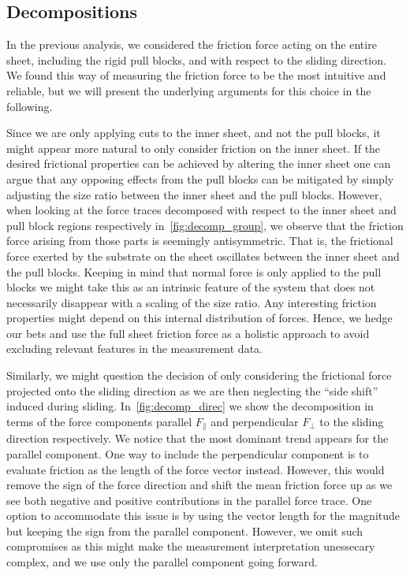 \subsection{Decompositions}
In the previous analysis, we considered the friction force acting on the entire
sheet, including the rigid pull blocks, and with respect to the sliding
direction. We found this way of measuring the friction force to be the most
intuitive and reliable, but we will present the underlying arguments for this
choice in the following.

Since we are only applying cuts to the inner sheet, and not the pull blocks, it
might appear more natural to only consider friction on the inner sheet. If the
desired frictional properties can be achieved by altering the inner sheet one
can argue that any opposing effects from the pull blocks can be mitigated by
simply adjusting the size ratio between the inner sheet and the pull blocks.
However, when looking at the force traces decomposed with respect to the inner
sheet and pull block regions respectively in~\cref{fig:decomp_group}, we observe
that the friction force arising from those parts is seemingly antisymmetric.
That is, the frictional force exerted by the substrate on the sheet oscillates
between the inner sheet and the pull blocks. Keeping in mind that normal force
is only applied to the pull blocks we might take this as an intrinsic feature of
the system that does not necessarily disappear with a scaling of the size ratio.
Any interesting friction properties might depend on this internal distribution
of forces. Hence, we hedge our bets and use the full sheet friction force as a
holistic approach to avoid excluding relevant features in the measurement data.

Similarly, we might question the decision of only considering the frictional
force projected onto the sliding direction as we are then neglecting the ``side
shift'' induced during sliding. In~\cref{fig:decomp_direc} we show the
decomposition in terms of the force components parallel $F_{\parallel}$ and
perpendicular $F_{\perp}$ to the sliding direction respectively. We notice that
the most dominant trend appears for the parallel component. One way to include
the perpendicular component is to evaluate friction as the length of the force
vector instead. However, this would remove the sign of the force direction and
shift the mean friction force up as we see both negative and positive
contributions in the parallel force trace. One option to accommodate this issue
is by using the vector length for the magnitude but keeping the sign from the
parallel component. However, we omit such compromises as this might make the
measurement interpretation unessecary complex, and we use only the parallel
component going forward. 


